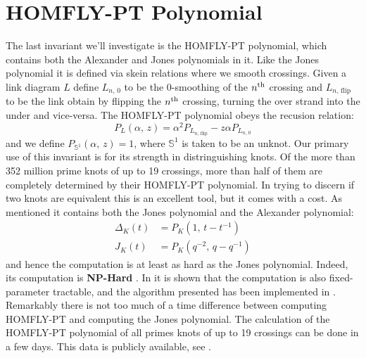 \section{HOMFLY-PT Polynomial}
    The last invariant we'll investigate is the HOMFLY-PT polynomial, which
    contains both the Alexander and Jones polynomials in it. Like the Jones
    polynomial it is defined via skein relations where we smooth crossings.
    Given a link diagram $L$ define $L_{n,\,0}$ to be the 0-smoothing of the
    $n^{\small\textrm{th}}$ crossing and $L_{n,\,\textrm{flip}}$ to be the
    link obtain by flipping the $n^{\small\textrm{th}}$ crossing, turning the
    over strand into the under and vice-versa. The HOMFLY-PT polynomial obeys
    the recusion relation:
    \begin{equation}
        P_{L}(\alpha,\,z)
        =\alpha^{2}P_{L_{n,\,\textrm{flip}}}-z\alpha{P}_{L_{n,\,0}}
    \end{equation}
    and we define $P_{\mathbb{S}^{1}}(\alpha,\,z)=1$, where
    $\mathbb{S}^{1}$ is taken to be an unknot. Our primary use of this
    invariant is for its strength in distringuishing knots. Of the more than
    352 million prime knots of up to 19 crossings, more than half of them are
    completely determined by their HOMFLY-PT polynomial. In trying to discern
    if two knots are equivalent this is an excellent tool, but it comes with a
    cost. As mentioned it contains both the Jones polynomial and the
    Alexander polynomial:
    \begin{align}
        \Delta_{K}(t)&=P_{K}(1,\,t-t^{-1})\\
        J_{K}(t)&=P_{K}(q^{-2},\,q-q^{-1})
    \end{align}
    and hence the computation is at least as hard as the Jones polynomial.
    Indeed, its computation is \textbf{NP-Hard}
    \cite[p.~653]{HOMFLYPTNPHard}. In
    \cite{Burton2018HOMFLFixedParameter} it is shown that the computation is
    also fixed-parameter tractable, and the algorithm presented has been
    implemented in \cite{regina}. Remarkably there is not too much of a time
    difference between computing HOMFLY-PT and computing the Jones polynomial.
    The calculation of the HOMFLY-PT polynomial of all primes knots of up to
    19 crossings can be done in a few days. This data is publicly available,
    see \cite{HOMFLYData}.
